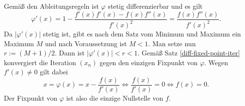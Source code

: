\begin{Beweis}
Gemäß den Ableitungsregeln ist $\varphi$ stetig differenzierbar
und es gilt%
\[\varphi'(x) = 1-\frac{f'(x)f'(x)-f(x)f''(x)}{f'(x)^2}
= \frac{f(x)f''(x)}{f'(x)^2}.\]
Da $|\varphi'(x)|$ stetig ist, gibt es nach dem Satz vom Minimum
und Maximum ein Maximum $M$ und nach Voraussetzung ist $M<1$.
Man setze nun $r:=(M+1)/2$. Dann ist $|\varphi'(x)|<r<1$.
Gemäß Satz \ref{diff-fixed-point-iter} konvergiert die Iteration
$(x_n)$ gegen den einzigen Fixpunkt von $\varphi$. Wegen $f'(x)\ne 0$
gilt dabei%
\[x = \varphi(x) = x-\frac{f(x)}{f'(x)} \iff \frac{f(x)}{f'(x)}=0\iff f(x)=0.\]
Der Fixpunkt von $\varphi$ ist also die einzige Nullstelle von $f$.\;\qedsymbol
\end{Beweis}

